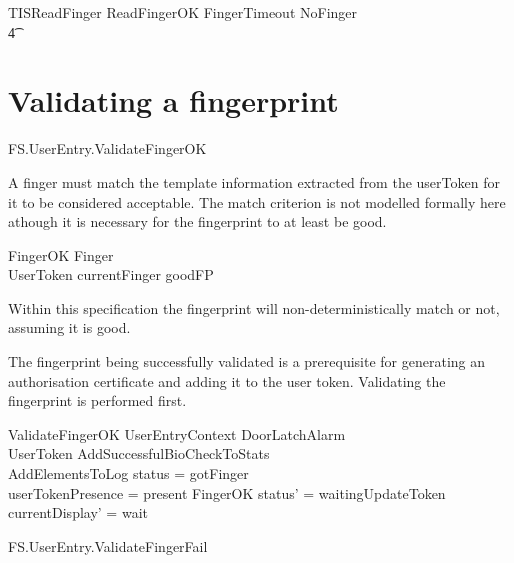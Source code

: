 \begin{zed}
        TISReadFinger  ReadFingerOK \lor
        FingerTimeout \lor NoFinger 
\\ \t4  \lor [~ UserTokenTorn | status = waitingFinger ~]
\end{zed}

\section{Validating a fingerprint}

\begin{traceunit}{FS.UserEntry.ValidateFingerOK}
\end{traceunit}


A finger must match the template information extracted from the
userToken for it to be considered acceptable. The match criterion is
not modelled formally here athough it is necessary for the 
fingerprint to at least be good.

\begin{schema}{FingerOK}
        Finger
\\      UserToken
\where
        currentFinger \in \ran goodFP
\end{schema}

Within this specification the fingerprint will non-deterministically
match or not, assuming it is good.

The fingerprint being successfully validated is a prerequisite for
generating an authorisation certificate and adding it to the user token.
Validating the fingerprint is performed first.

\begin{schema}{ValidateFingerOK}
	UserEntryContext
\also
	\Xi DoorLatchAlarm
\\      \Xi UserToken
\also
        AddSuccessfulBioCheckToStats
\\      AddElementsToLog
\where
	status = gotFinger
\\      userTokenPresence = present
\also
        FingerOK
\also
	status' = waitingUpdateToken
\\	currentDisplay' = wait
\end{schema}


\begin{traceunit}{FS.UserEntry.ValidateFingerFail}
\end{traceunit}


